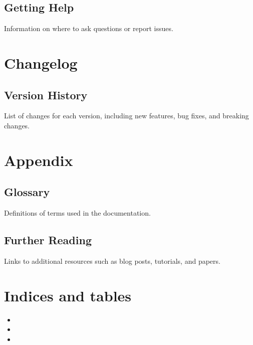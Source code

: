 \documentclass[letterpaper,10pt,english]{sphinxmanual}
\begin{document}
\section{Getting Help}
\label{\detokenize{troubleshooting:getting-help}}
\sphinxAtStartPar
Information on where to ask questions or report issues.

\sphinxstepscope


\chapter{Changelog}
\label{\detokenize{changelog:changelog}}\label{\detokenize{changelog::doc}}

\section{Version History}
\label{\detokenize{changelog:version-history}}
\sphinxAtStartPar
List of changes for each version, including new features, bug fixes, and breaking changes.

\sphinxstepscope


\chapter{Appendix}
\label{\detokenize{appendix:appendix}}\label{\detokenize{appendix::doc}}

\section{Glossary}
\label{\detokenize{appendix:glossary}}
\sphinxAtStartPar
Definitions of terms used in the documentation.


\section{Further Reading}
\label{\detokenize{appendix:further-reading}}
\sphinxAtStartPar
Links to additional resources such as blog posts, tutorials, and papers.


\chapter{Indices and tables}
\label{\detokenize{index:indices-and-tables}}\begin{itemize}
\item {} 
\sphinxAtStartPar
{}

\item {} 
\sphinxAtStartPar
{}

\item {} 
\sphinxAtStartPar
{}

\end{itemize}



\renewcommand{\indexname}{Index}
\printindex
\end{document}
